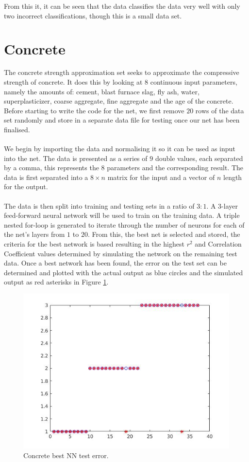 \documentclass{article}%
\begin{document}
From this it, it can be seen that the data classifies the data very well with only two incorrect classifications, though this is a small data set.
\section{Concrete}
The concrete strength approximation set seeks to approximate the compressive strength of concrete. It does this by looking at 8 continuous input parameters, namely the amounts of: cement, blast furnace slag, fly ash, water, superplasticizer, coarse aggregate, fine aggregate and the age of the concrete. Before starting to write the code for the net, we first remove $20$ rows of the data set randomly and store in a separate data file for testing once our net has been finalised.
\\
\\
We begin by importing the data and normalising it so it can be used as input into the net. The data is presented as a series of $9$ double values, each separated by a comma, this represents the $8$ parameters and the corresponding result. The data is first separated into a $8 \times n$ matrix for the input and a vector of $n$ length for the output.
\\
\\
The data is then split into training and testing sets in a ratio of $3:1$. A 3-layer feed-forward neural network will be used to train on the training data. A triple nested for-loop is generated to iterate through the number of neurons for each of the net's layers from $1$ to $20$. From this, the best net is selected and stored, the criteria for the best network is based resulting in the highest $r^2$ and Correlation Coefficient values determined by simulating the network on the remaining test data. Once a best network has been found, the error on the test set can be determined and plotted with the actual output as blue circles and the simulated output as red asterisks in Figure \ref{fig:contrain}.
\begin{figure}[H]
\centering
\includegraphics[scale=0.5]{Images/seedtrain.jpg}
\caption{Concrete best NN test error.}
\label{fig:contrain}
\end{figure}
\end{document}
